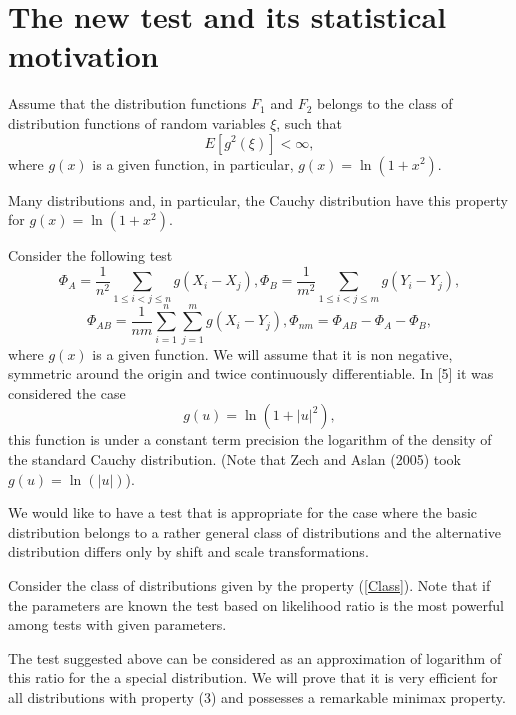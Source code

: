 \documentclass[final,11pt,3p]{elsarticle}
\begin{document}
\section{The new test and its statistical motivation}

Assume that the distribution functions
$F_1$ and $F_2$ belongs to the class of distribution functions of random variables  $\xi$, such that
\begin {equation}\label{Class}
E [g^2(\xi)    ] < \infty,
\end{equation} 
where $g(x)$ is a given function, in particular, $g(x)= \ln(1+x^2)$.

Many distributions and, in particular, the Cauchy distribution have this property for $g(x)= \ln(1+x^2)$.
 \bigskip

Consider the following test
\begin{equation}\label{K}
 \Phi_{A}=\frac{1}{n^2}\sum_{1\leq i<j\leq n} g(X_i-X_j),
\Phi_{B}=\frac{1}{m^2}\sum_{1\leq i<j\leq m} g(Y_i-Y_j),
\end{equation}
\begin{equation}\label{K1}
\Phi_{AB}=\frac{1}{nm}\sum_{i=1}^n\sum_{j=1}^m g(X_i-Y_j),
\Phi_{nm}=\Phi_{AB}-\Phi_{A}- \Phi_{B},
\end{equation}
where $g(x)$ is a given function. We will assume that it is non negative, symmetric around the origin and twice continuously differentiable.
In [5] it was considered the case
$$
g(u)=\ln (1+|u|^2),
$$
this function is under a constant term precision the logarithm of the density of the standard Cauchy distribution.
(Note that Zech and Aslan (2005) took $g(u)= \ln(|u|)$).



We would like to have a test that is appropriate for the case where the  basic distribution belongs to a rather general class of distributions and the alternative distribution  differs only by shift and scale transformations.


Consider the class of distributions given by the property (\ref{Class}). Note that if the parameters are known the test based on likelihood ratio is the most powerful among tests with given parameters.


The test suggested above can be considered as an approximation of logarithm of this ratio for the a special distribution. We will prove that it is very efficient for all distributions with property (3) and possesses a remarkable minimax property. 
\end{document}
